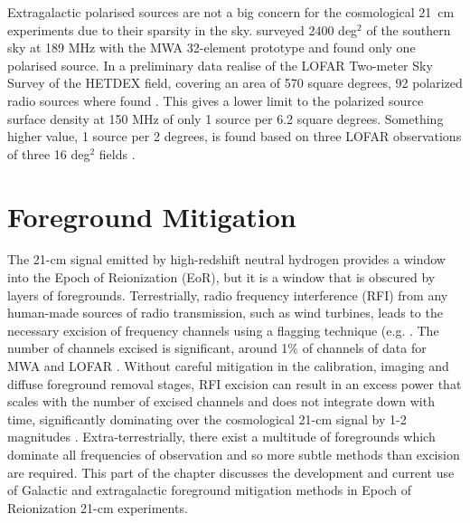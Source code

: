 Extragalactic polarised sources are not a big concern for the cosmological 21~cm experiments due to their sparsity in the sky. \cite{bernardi13} surveyed 2400 deg$^2$ of the southern sky at 189 MHz with the MWA 32-element prototype and found only one polarised source. In a preliminary data realise of the LOFAR Two-meter Sky Survey of the HETDEX field, covering an area of 570 square degrees, 92 polarized radio sources where found \cite{vaneck18}. This gives a lower limit to the polarized source surface density at 150 MHz of only 1 source per 6.2 square degrees. Something higher value, 1 source per 2 degrees, is found based on three LOFAR observations of three 16 deg$^2$ fields \cite{mulcahy14, jelic15, vaneck18}.
 
\section{Foreground Mitigation}

The 21-cm signal emitted by high-redshift neutral hydrogen provides a window into the Epoch of Reionization (EoR), but it is a window that is obscured by layers of foregrounds. Terrestrially, radio frequency interference (RFI) from any human-made sources of radio transmission, such as wind turbines, leads to the necessary excision of frequency channels using a flagging technique (e.g. \cite{Prasad2012ExA....33..157P,Offringa2012}. The number of channels excised is significant, around 1$\%$ of channels of data for MWA and LOFAR \cite{Offringa2019MNRAS.484.2866O,Offringa2015PASA...32....8O}. Without careful mitigation in the calibration, imaging and diffuse foreground removal stages, RFI excision can result in an excess power that scales with the number of excised channels and does not integrate down with time, significantly dominating over the cosmological 21-cm signal by 1-2 magnitudes \cite{Offringa2019MNRAS.484.2866O}. Extra-terrestrially, there exist a multitude of foregrounds which dominate all frequencies of observation and so more subtle methods than excision are required. This part of the chapter discusses the development and current use of Galactic and extragalactic foreground mitigation methods in Epoch of Reionization 21-cm experiments.


